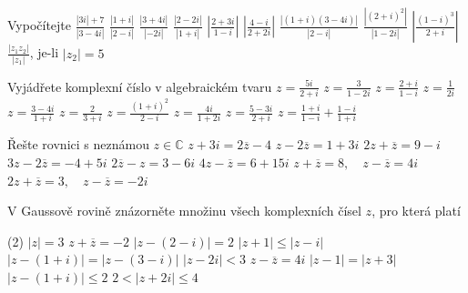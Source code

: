 \begin{exerciseblock}[2]{Vypočítejte}
    \task $\displaystyle \frac{|3i|+7}{|3-4i|}$
    \task $\displaystyle \frac{|1+i|}{|2-i|}$
    \task $\displaystyle \frac{|3+4i|}{|-2i|}$
    \task $\displaystyle \frac{|2-2i|}{|1+i|}$
    \task $\displaystyle \left|\frac{2+3i}{1-i}\right|$
    \task $\displaystyle \left|\frac{4-i}{2+2i}\right|$
    \task $\displaystyle \frac{|(1+i)(3-4i)|}{|2-i|}$
    \task $\displaystyle \frac{|(2+i)^2|}{|1-2i|}$
    \task $\displaystyle \left|\frac{(1-i)^3}{2+i}\right|$
    \task $\displaystyle \frac{|z_1z_2|}{|z_1|}$, je-li $|z_2|=5$
\end{exerciseblock}



\begin{exerciseblock}[2]{Vyjádřete komplexní číslo v algebraickém tvaru}
    \task $\displaystyle z=\frac{5i}{2+i}$
    \task $\displaystyle z=\frac{3}{1-2i}$
    \task $\displaystyle z=\frac{2+i}{1-i}$
    \task $\displaystyle z=\frac{1}{2i}$
    \task $\displaystyle z=\frac{3-4i}{1+i}$
    \task $\displaystyle z=\frac{2}{3+i}$
    \task $\displaystyle z=\frac{(1+i)^2}{2-i}$
    \task $\displaystyle z=\frac{4i}{1+2i}$
    \task $\displaystyle z=\frac{5-3i}{2+i}$
    \task $\displaystyle z=\frac{1+i}{1-i}+\frac{1-i}{1+i}$
\end{exerciseblock}



\begin{exerciseblock}[2]{Řešte rovnici s neznámou $z\in\mathbb{C}$}
    \task $z+3i=2\overline{z}-4$
    \task $z-2\overline{z}=1+3i$
    \task $2z+\overline{z}=9-i$
    \task $3z-2\overline{z}=-4+5i$
    \task $2\overline{z}-z=3-6i$
    \task $4z-\overline{z}=6+15i$
    \task $z+\overline{z}=8,\quad z-\overline{z}=4i$
    \task $2z+\overline{z}=3,\quad z-\overline{z}=-2i$
\end{exerciseblock}



\begin{exercise}{V Gaussově rovině znázorněte množinu všech komplexních čísel $z$, pro která platí}
    \begin{tasks}(2)
        \task $|z|=3$
        \task $z+\overline{z}=-2$
        \task $|z-(2-i)|=2$
        \task $|z+1|\leq|z-i|$
        \task $|z-(1+i)|=|z-(3-i)|$
        \task $|z-2i|<3$
        \task $z-\overline{z}=4i$
        \task $|z-1|=|z+3|$
        \task $|z-(1+i)|\leq2$
        \task $2<|z+2i|\leq4$
    \end{tasks}
\end{exercise}


